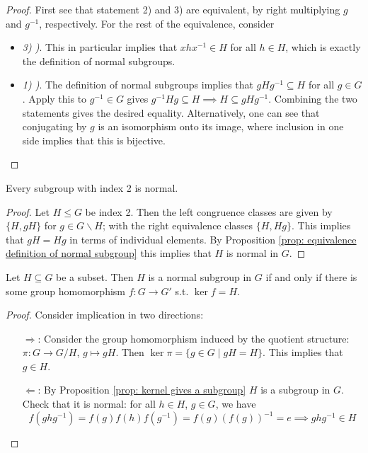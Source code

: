 \documentclass{article}
\begin{document}
\begin{proof}
    First see that statement 2) and 3) are equivalent, by right multiplying $g$ and $g^{-1}$, respectively. For the rest of the equivalence, consider
    \begin{itemize}
        \item \emph{3) )}. This in particular implies that $xhx^{-1} \in H$ for all $h \in H$, which is exactly the definition of normal subgroups.
        \item \emph{1) )}. The definition of normal subgroups implies that $gHg^{-1} \subseteq H$ for all $g \in G$. Apply this to $g^{-1} \in G$ gives $g^{-1} H g \subseteq H \implies H \subseteq gHg^{-1}$. Combining the two statements gives the desired equality. Alternatively, one can see that conjugating by $g$ is an isomorphism onto its image, where inclusion in one side implies that this is bijective. 
    \end{itemize}
\end{proof}

\begin{corollary}
    Every subgroup with index 2 is normal.
\end{corollary}

\begin{proof}
    Let $H \leq G$ be index 2. Then the left congruence classes are given by $\{ H, gH \}$ for $g \in G \smallsetminus H$; with the right equivalence classes $\{ H, Hg \}$. This implies that $gH = Hg$ in terms of individual elements. By Proposition \ref{prop: equivalence definition of normal subgroup} this implies that $H$ is normal in $G$. 
\end{proof}

\begin{proposition}\label{prop: kernel gives a normal subgroup}
    Let $H \subseteq G$ be a subset. Then $H$ is a normal subgroup in $G$ if and only if there is some group homomorphism $f: G \to G'$ s.t. $\ker f = H$.
\end{proposition}

\begin{proof}
    Consider implication in two directions:
    \begin{enumerate}
        \item[$\Rightarrow$:] Consider the group homomorphism induced by the quotient structure: $\pi: G \to G/H$, $g \mapsto gH$. Then $\ker \pi = \{ g \in G \mid gH = H \}$. This implies that $g \in H$.
        \item[$\Leftarrow$:] By Proposition \ref{prop: kernel gives a subgroup} $H$ is a subgroup in $G$. Check that it is normal: for all $h \in H$, $g \in G$, we have
        \[
            f(ghg^{-1}) = f(g) f(h) f(g^{-1}) = f(g) (f(g))^{-1} = e \implies ghg^{-1} \in H
        \]
    \end{enumerate}
\end{proof}
\end{document}
